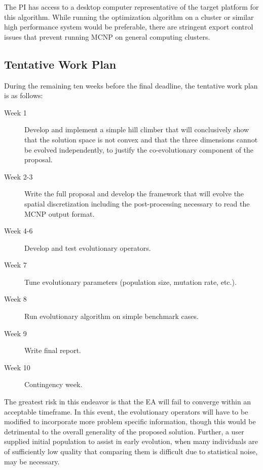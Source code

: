 \documentclass{article}
\begin{document}
The PI has access to a desktop computer representative of the target platform for this algorithm. While running the optimization algorithm on a cluster or similar high performance system would be preferable, there are stringent export control issues that prevent running MCNP on general computing clusters. 

\subsection{Tentative Work Plan}\label{sec:b5}
During the remaining ten weeks before the final deadline, the tentative work plan is as follows:

\begin{description}
\item[Week 1] Develop and implement a simple hill climber that will conclusively show that the solution space is not convex and that the three dimensions cannot be evolved independently, to justify the co-evolutionary component of the proposal.

\item[Week 2-3] Write the full proposal and develop the framework that will evolve the spatial discretization including the post-processing necessary to read the MCNP output format.

\item [Week 4-6] Develop and test evolutionary operators.

\item [Week 7] Tune evolutionary parameters (population size, mutation rate, etc.).

\item [Week 8] Run evolutionary algorithm on simple benchmark cases.

\item [Week 9] Write final report.

\item [Week 10] Contingency week.
\end{description}

The greatest risk in this endeavor is that the EA will fail to converge within an acceptable timeframe. In this event, the evolutionary operators will have to be modified to incorporate more problem specific information, though this would be detrimental to the overall generality of the proposed solution. Further, a user supplied initial population to assist in early evolution, when many individuals are of sufficiently low quality that comparing them is difficult due to statistical noise, may be necessary.

{}

\end{document}
